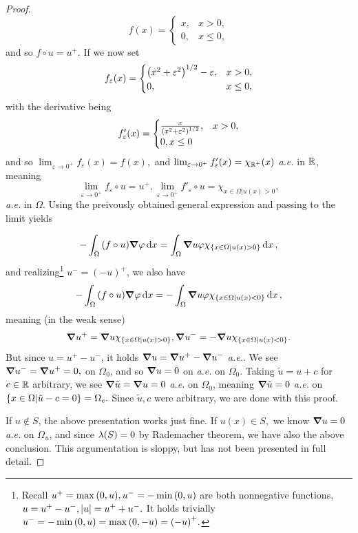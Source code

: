 \documentclass{article}
\begin{document}
\begin{proof}
\[
	f(x) =
	\begin{cases}
		x, & x>0,\\
		0, & x\leq 0,
	\end{cases}
\]
and so $f \circ u = u^{+}.$ If we now set
\[
	f_{\varepsilon}(x) =
	\begin{cases}
		\qty(x^{2}+\varepsilon^{2})^{1/2} - \varepsilon, & x > 0, \\
		0, & x\leq 0,
	\end{cases}
\]
with the derivative being
\[
	f'_{\varepsilon}(x) =
	\begin{cases}
		\frac{x}{\qty(x^{2}+\varepsilon^{2})^{1/2}}, & x >0, \\
		0, x \leq 0
	\end{cases}
\]
and so $\lim_{\varepsilon \to 0^+}f_{\varepsilon}(x) = f(x),$ and $\lim_{\varepsilon \to 0^+}f'_{\varepsilon}(x) = \chi_{{\mathbb R}^+}(x) $ \textit{a.e.} in ${\mathbb R}$, meaning
\[
	\lim_{\varepsilon \to 0^+}f_{\varepsilon}\circ u = u^+, \lim_{\varepsilon \to 0^+}f'_{\varepsilon}\circ u = \chi_{x \in \Omega| u(x) > 0},
\]
\textit{a.e.} in $\Omega$. Using the preivously obtained general expression and passing to the limit yields

\[
	- \int_{\Omega}\qty(f \circ u)\grad \varphi\dd{x} = \int_{\Omega}\grad u \varphi \chi_{\qty{x\in \Omega| u(x) > 0}}\dd{x},
\]
and realizing\footnote{Recall $u^+ = \max\qty(0, u), u^- = -\min\qty(0, u)$ are both nonnegative functions, $u = u^+ - u^-, \abs{u} = u^+ + u^-.$ It holds trivially $u^- = - \min\qty(0, u) = \max\qty(0, -u) = \qty(-u)^{+}.$} $u^- = (-u)^+$, we also have
\[
	- \int_{\Omega}\qty(f \circ u)\grad \varphi\dd{x} = -\int_{\Omega}\grad u \varphi \chi_{\qty{x\in \Omega| u(x) < 0}}\dd{x},
\]
meaning (in the weak sense)
\[
	\grad u^+ = \grad u \chi_{\qty{x \in \Omega | u(x) >0}}, \grad u^- = -\grad u\chi_{\qty{x \in \Omega | u(x) <0}}.
\]
But since $u = u^+ - u^-$, it holds $\grad u = \grad u^+ - \grad u^-$ \textit{a.e.}. We see $\grad u^- = \grad u^+ = 0,$ on $\Omega_0$, and so $\grad u = 0$ on \textit{a.e.} on $\Omega_0.$ Taking $\tilde{u} = u + c$ for $c \in {\mathbb R}$ arbitrary, we see $\grad \tilde{u} = \grad u = 0$ \textit{a.e.} on $\Omega_0$, meaning $\grad \tilde{u} = 0$ \textit{a.e.} on $\qty{x \in \Omega| \tilde{u}-c = 0} = \Omega_c.$ Since $\tilde{u}, c$ were arbitrary, we are done with this proof.

If $u \notin S$, the above presentation works just fine. If $u(x) \in S,$ we know $\grad u = 0$ \textit{a.e.} on $\Omega_u$, and since $\lambda\qty(S) = 0$ by Rademacher theorem, we have also the above conclusion. This argumentation is sloppy, but has not been presented in full detail.

\end{proof}
\end{document}
